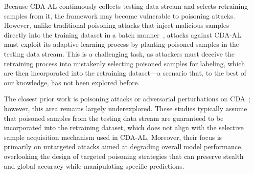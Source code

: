 Because CDA-AL continuously collects testing data stream and selects retraining samples from it, the framework may become vulnerable to poisoning attacks. 
However, unlike traditional poisoning attacks that inject malicious samples directly into the training dataset in a batch manner~\cite{2022-ACM-Computing-Survey-Threats-to-training, 2024-SP-Offline-RL-Backdoor,2018-NIPS-Poison-frogs,2018-SP-poisoning-regression,2024-TIFS-Backdoor-Contrastive-Learning}, attacks against CDA-AL must exploit its adaptive learning process by planting poisoned samples in the testing data stream. 
This is a challenging task, as attackers must deceive the retraining process into mistakenly selecting poisoned samples for labeling, which are then incorporated into the retraining dataset—a scenario that, to the best of our knowledge, has not been explored before.

The closest prior work is poisoning attacks or adversarial perturbations on CDA~\cite{2023-CCF-B-Adversarial-concept-drift-detection-under-poisoning-attacks, apruzzese2024adversarial};
however, this area remains largely underexplored. 
These studies typically assume that poisoned samples from the testing data stream are guaranteed to be incorporated into the retraining dataset, which does not align with the selective sample acquisition mechanism used in CDA-AL. 
Moreover, their focus is primarily on untargeted attacks aimed at degrading overall model performance, overlooking the design of targeted poisoning strategies that can preserve stealth and global accuracy while manipulating specific predictions.

